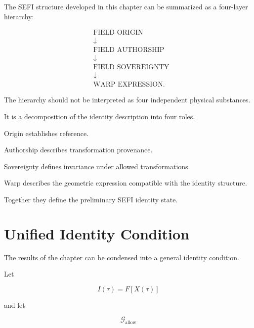 \documentclass[12pt,oneside]{book}
\begin{document}
The SEFI structure developed in this chapter can be summarized
as a four-layer hierarchy:

\begin{equation}
\boxed{
\begin{aligned}
    &\text{FIELD ORIGIN}
    \\
    &\downarrow
    \\
    &\text{FIELD AUTHORSHIP}
    \\
    &\downarrow
    \\
    &\text{FIELD SOVEREIGNTY}
    \\
    &\downarrow
    \\
    &\text{WARP EXPRESSION}.
\end{aligned}
}
\label{eq:four-layer-sefi-hierarchy}
\end{equation}

The hierarchy should not be interpreted as four independent
physical substances.

It is a decomposition of the identity description into four
roles.

Origin establishes reference.

Authorship describes transformation provenance.

Sovereignty defines invariance under allowed transformations.

Warp describes the geometric expression compatible with the
identity structure.

Together they define the preliminary SEFI identity state.


\section{Unified Identity Condition}
\label{sec:unified-identity-condition}

The results of the chapter can be condensed into a general
identity condition.

Let

\begin{equation}
    I(\tau)
    =
    F[X(\tau)]
\end{equation}

and let

\begin{equation}
    \mathcal{G}_{\mathrm{allow}}
\end{equation}
\end{document}
